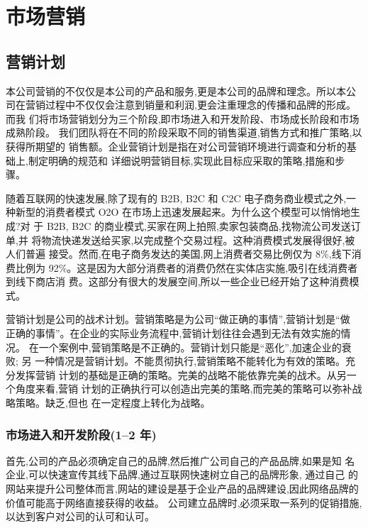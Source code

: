 \chapter{市场营销}
\section{营销计划}
本公司营销的不仅仅是本公司的产品和服务,更是本公司的品牌和理念。所以本公
司在营销过程中不仅仅会注意到销量和利润,更会注重理念的传播和品牌的形成。而我
们将市场营销划分为三个阶段,即市场进入和开发阶段、市场成长阶段和市场成熟阶段。
我们团队将在不同的阶段采取不同的销售渠道,销售方式和推广策略,以获得所期望的
销售额。企业营销计划是指在对公司营销环境进行调查和分析的基础上,制定明确的规范和
详细说明营销目标,实现此目标应采取的策略,措施和步骤。

随着互联网的快速发展,除了现有的 B2B, B2C 和 C2C 电子商务商业模式之外,一
种新型的消费者模式 O2O 在市场上迅速发展起来。为什么这个模型可以悄悄地生成?对
于 B2B, B2C 的商业模式,买家在网上拍照,卖家包装商品,找物流公司发送订单,并
将物流快递发送给买家,以完成整个交易过程。这种消费模式发展得很好,被人们普遍
接受。然而,在电子商务发达的美国,网上消费者交易比例仅为 8\%,线下消费比例为
92\%。这是因为大部分消费者的消费仍然在实体店实施,吸引在线消费者到线下商店消
费。这部分有很大的发展空间,所以一些企业已经开始了这种消费模式。

营销计划是公司的战术计划。营销策略是为公司“做正确的事情”,营销计划是“做
正确的事情”。在企业的实际业务流程中,营销计划往往会遇到无法有效实施的情况。
在一个案例中,营销策略是不正确的。营销计划只能是“恶化”,加速企业的衰败; 另
一种情况是营销计划。不能贯彻执行,营销策略不能转化为有效的策略。充分发挥营销
计划的基础是正确的策略。完美的战略不能依靠完美的战术。从另一个角度来看,营销
计划的正确执行可以创造出完美的策略,而完美的策略可以弥补战略策略。缺乏,但也
在一定程度上转化为战略。

\subsection{市场进入和开发阶段(1--2 年)}
首先,公司的产品必须确定自己的品牌,然后推广公司自己的产品品牌,如果是知
名企业,可以快速宣传其线下品牌,通过互联网快速树立自己的品牌形象, 通过自己
的网站来提升公司整体而言,网站的建设是基于企业产品的品牌建设,因此网络品牌的
价值可能高于网络直接获得的收益。 公司建立品牌时,必须采取一系列的促销措施,
以达到客户对公司的认可和认可。

